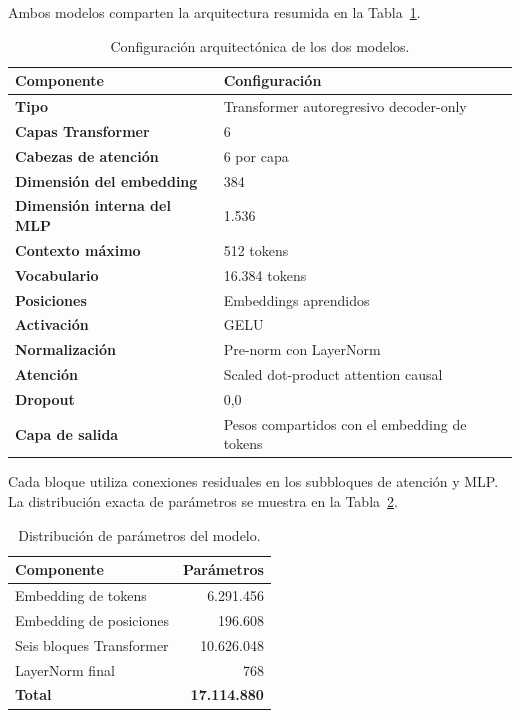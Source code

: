 \documentclass[11pt,a4paper]{article}
\begin{document}
Ambos modelos comparten la arquitectura resumida en la
Tabla~\ref{tab:arquitectura}.

\begin{table}[H]
    \centering
    \caption{Configuración arquitectónica de los dos modelos.}
    \label{tab:arquitectura}
    \begin{tabularx}{0.82\textwidth}{>{\bfseries}l X}
        \toprule
        Componente & Configuración \\
        \midrule
        Tipo & Transformer autoregresivo decoder-only \\
        Capas Transformer & 6 \\
        Cabezas de atención & 6 por capa \\
        Dimensión del embedding & 384 \\
        Dimensión interna del MLP & 1.536 \\
        Contexto máximo & 512 tokens \\
        Vocabulario & 16.384 tokens \\
        Posiciones & Embeddings aprendidos \\
        Activación & GELU \\
        Normalización & Pre-norm con LayerNorm \\
        Atención & Scaled dot-product attention causal \\
        Dropout & 0,0 \\
        Capa de salida & Pesos compartidos con el embedding de tokens \\
        \bottomrule
    \end{tabularx}
\end{table}

Cada bloque utiliza conexiones residuales en los subbloques de atención y MLP.
La distribución exacta de parámetros se muestra en la
Tabla~\ref{tab:parametros}.

\begin{table}[H]
    \centering
    \caption{Distribución de parámetros del modelo.}
    \label{tab:parametros}
    \begin{tabular}{lr}
        \toprule
        Componente & Parámetros \\
        \midrule
        Embedding de tokens & 6.291.456 \\
        Embedding de posiciones & 196.608 \\
        Seis bloques Transformer & 10.626.048 \\
        LayerNorm final & 768 \\
        \midrule
        \textbf{Total} & \textbf{17.114.880} \\
        \bottomrule
    \end{tabular}
\end{table}
\end{document}
